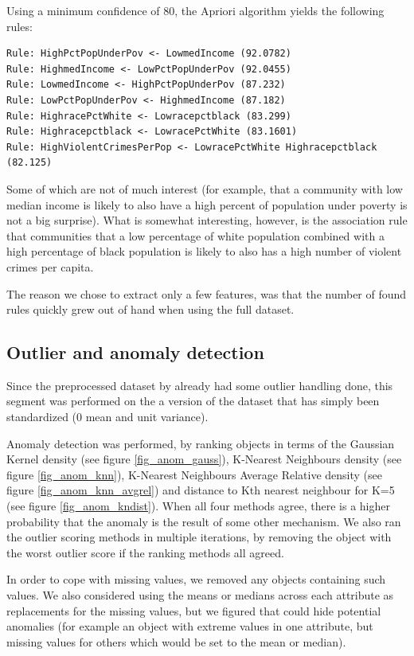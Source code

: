 \documentclass[a4paper]{article}
\begin{document}
Using a minimum confidence of 80, the Apriori algorithm yields the following rules:
\begin{verbatim}
Rule: HighPctPopUnderPov <- LowmedIncome (92.0782)
Rule: HighmedIncome <- LowPctPopUnderPov (92.0455)
Rule: LowmedIncome <- HighPctPopUnderPov (87.232)
Rule: LowPctPopUnderPov <- HighmedIncome (87.182)
Rule: HighracePctWhite <- Lowracepctblack (83.299)
Rule: Highracepctblack <- LowracePctWhite (83.1601)
Rule: HighViolentCrimesPerPop <- LowracePctWhite Highracepctblack (82.125)
\end{verbatim}
Some of which are not of much interest (for example, that a community with low median income is likely to also have a high percent of population under poverty is not a big surprise). What is somewhat interesting, however, is the association rule that communities that a low percentage of white population combined with a high percentage of black population is likely to also has a high number of violent crimes per capita.

The reason we chose to extract only a few features, was that the number of found rules quickly grew out of hand when using the full dataset.



\subsection{Outlier and anomaly detection}
Since the preprocessed dataset by \cite{redmond09} already had some outlier handling done, this segment was performed on the a version of the dataset that has simply been standardized (0 mean and unit variance).

Anomaly detection was performed, by ranking objects in terms of the Gaussian Kernel density (see figure \ref{fig_anom_gauss}), K-Nearest Neighbours density (see figure \ref{fig_anom_knn}), K-Nearest Neighbours Average Relative density (see figure \ref{fig_anom_knn_avgrel}) and distance to Kth nearest neighbour for K=5 (see figure \ref{fig_anom_kndist}). When all four methods agree, there is a higher probability that the anomaly is the result of some other mechanism. We also ran the outlier scoring methods in multiple iterations, by removing the object with the worst outlier score if the ranking methods all agreed.

In order to cope with missing values, we removed any objects containing such values. We also considered using the means or medians across each attribute as replacements for the missing values, but we figured that could hide potential anomalies (for example an object with extreme values in one attribute, but missing values for others which would be set to the mean or median). 
\end{document}
